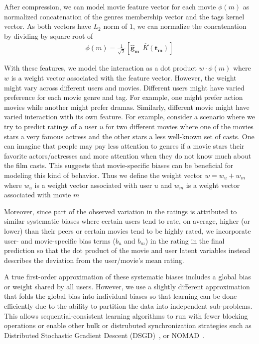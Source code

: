 \documentclass{article} %
\newcommand{\kernel}{K}
\begin{document}
After compression, we can model movie feature vector for each movie $\phi(m)$ as normalized concatenation of the genres membership vector and the tags kernel vector. As both vectors have $L_2$ norm of $1$, we can normalize the concatenation by dividing by square root of
\begin{align}
	\phi(m) = \frac{1}{\sqrt{2}} [\bm{\hat{g}_m}\ \ \hat{\kernel}(\bm{t_m})]
\end{align}

With these features, we model the interaction as a dot product $w \cdot
\phi(m)$ where $w$ is a weight vector associated with the feature vector.
However, the weight might vary across different users and movies. Different
users might have varied preference for each movie genre and tag. For
example, one might prefer action movies while another might prefer dramas.
Similarly, different movie might have varied interaction with its own
feature. For example, consider a scenario where we try to predict ratings of
a user $u$ for two different movies where one of the movies stars a very
famous actress and the other stars a less well-known set of casts. One can
imagine that people may pay less attention to genres if a movie stars their
favorite actors/actresses and more attention when they do not know much
about the film casts. This suggests that movie-specific biases can be
beneficial for modeling this kind of behavior.  Thus we define the weight
vector $w = w_u + w_m$ where $w_u$ is a weight vector associated with user
$u$ and  $w_m$ is a weight vector associated with movie $m$

Moreover, since part of the observed variation in the ratings is attributed
to similar systematic biases \cite{koren:matrix} where certain users tend to
rate, on average, higher (or lower) than their peers or certain movies tend
to be highly rated, we incorporate user- and movie-specific bias terms
($b_u$ and $b_m$) in the rating in the final prediction so that the dot
product of the movie and user latent variables instead describes the
deviation from the user/movie's mean rating.

A true first-order approximation of these systematic biases includes a
global bias or weight shared by all users. However, we use a slightly
different approximation that folds the global bias into individual biases so
that learning can be done efficiently due to the ability to  partition the
data into independent sub-problems. This allows sequential-consistent
learning algorithms to run with fewer blocking operations or enable other
bulk or distrubuted synchronization strategies such as Distributed
Stochastic Gradient Descent (DSGD)~\cite{gemulla2011large}, or
NOMAD~\cite{yun2013nomad}.
\end{document}
